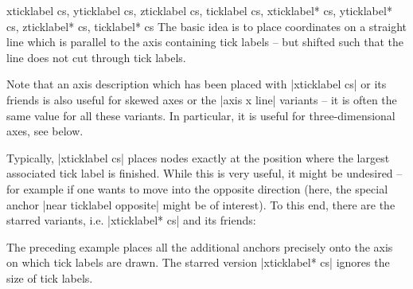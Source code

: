 \begin{coordinatesystemlist}{%
    xticklabel cs,
    yticklabel cs,
    zticklabel cs,
    ticklabel cs,
    xticklabel* cs,
    yticklabel* cs,
    zticklabel* cs,
    ticklabel* cs%
}
    The basic idea is to place coordinates on a straight line which is parallel
    to the axis containing tick labels -- but shifted such that the line does
    not cut through tick labels.

    Note that an axis description which has been placed with |xticklabel cs| or
    its friends is also useful for skewed axes or the |axis x line| variants --
    it is often the same value for all these variants. In particular, it is
    useful for three-dimensional axes, see below.

    Typically, |xticklabel cs| places nodes exactly at the position where the
    largest associated tick label is finished. While this is very useful, it
    might be undesired -- for example if one wants to move into the opposite
    direction (here, the special anchor |near ticklabel opposite| might be of
    interest). To this end, there are the starred variants, i.e.\@
    |xticklabel* cs| and its friends:
\begin{codeexample}[width=4cm]
\end{codeexample}
    \noindent The preceding example places all the additional anchors precisely
    onto the axis on which tick labels are drawn. The starred version
    |xticklabel* cs| ignores the size of tick labels.


\end{coordinatesystemlist}
